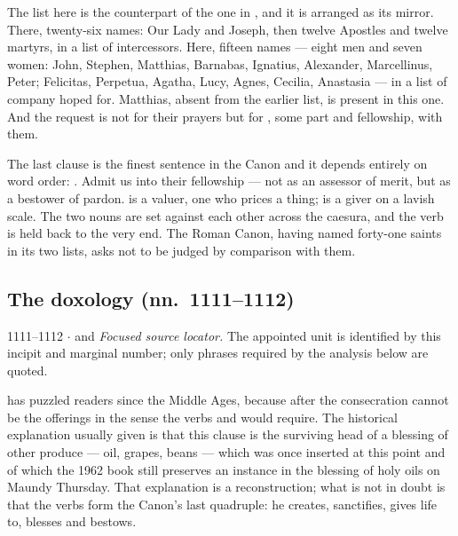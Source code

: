 The list here is the counterpart of the one in , and it
is arranged as its mirror. There, twenty-six names: Our Lady and Joseph, then
twelve Apostles and twelve martyrs, in a list of intercessors. Here, fifteen
names --- eight men and seven women: John, Stephen, Matthias, Barnabas,
Ignatius, Alexander, Marcellinus, Peter; Felicitas, Perpetua, Agatha, Lucy,
Agnes, Cecilia, Anastasia --- in a list of company hoped for. Matthias, absent
from the earlier list, is present in this one. And the request is not for their
prayers but for , some part and
fellowship, with them.

The last clause is the finest sentence in the Canon and it depends entirely on
word order: . Admit us into their fellowship --- not as
an assessor of merit, but as a bestower of pardon.  is a
valuer, one who prices a thing;  is a giver on a lavish
scale. The two nouns are set against each other across the caesura, and the
verb  is held back to the very end. The Roman Canon, having
named forty-one saints in its two lists, asks not to be judged by comparison
with them.

\subsection*{The doxology (nn.~1111--1112)}

\begin{appointed}{1111--1112 $\cdot$  and }
\textit{Focused source locator.} The appointed unit is identified by this incipit and marginal number; only phrases required by the analysis below are quoted.
\end{appointed}

 has puzzled readers
since the Middle Ages, because  after the consecration
cannot be the offerings in the sense the verbs  and
 would require. The historical explanation usually given
is that this clause is the surviving head of a blessing of other produce ---
oil, grapes, beans --- which was once inserted at this point and of which the
1962 book still preserves an instance in the blessing of holy oils on Maundy
Thursday. That explanation is a reconstruction; what is not in doubt is that
the verbs form the Canon's last quadruple: he creates, sanctifies, gives life
to, blesses and bestows.

